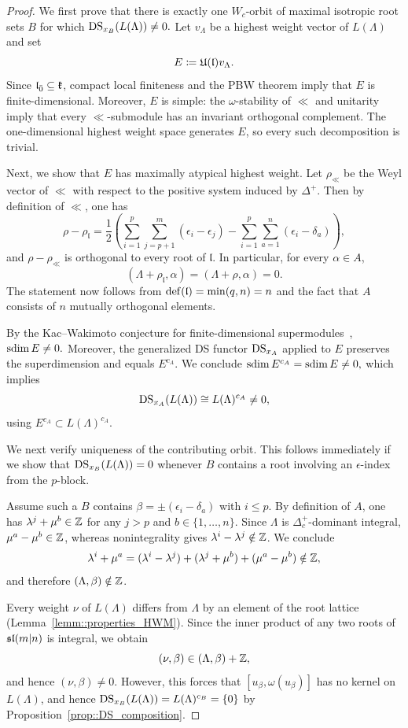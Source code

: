 \begin{proof} 
We first prove that there is exactly one $W_c$-orbit of maximal isotropic root sets $B$ for which
$
\DS_{x_B}(L(\Lambda))\neq0.
$
Let $v_\Lambda$ be a highest weight vector of $L(\Lambda)$ and set
\[
E\coloneqq\UE(\mathfrak l)v_\Lambda.
\]
Since $\mathfrak l_{\bar0}\subseteq\kk$, compact local finiteness and the PBW theorem imply that $E$ is finite-dimensional. 
Moreover, $E$ is simple: the $\omega$-stability of $\ll$ and unitarity imply that every $\ll$-submodule has an invariant orthogonal complement. The one-dimensional highest weight space generates $E$, so every such decomposition is trivial.

Next, we show that $E$ has maximally atypical highest weight. Let $\rho_{\ll}$ be the Weyl vector of $\ll$ with respect to the positive system induced by $\Delta^+$. Then by definition of $\ll$, one has
\[
\rho-\rho_{\mathfrak l}
=
\frac12\left(
\sum_{i=1}^p\sum_{j=p+1}^m(\epsilon_i-\epsilon_j)
-
\sum_{i=1}^p\sum_{a=1}^n(\epsilon_i-\delta_a)
\right),
\]
and $\rho-\rho_{\ll}$ is orthogonal to every root of $\mathfrak l$. In particular, for every $\alpha\in A$,
\[
(\Lambda+\rho_{\mathfrak l},\alpha)
=
(\Lambda+\rho,\alpha)=0.
\]
The statement now follows from $
\defect(\mathfrak l)=\min(q,n)=n
$ and the fact that $A$ consists of $n$ mutually orthogonal elements.

By the Kac--Wakimoto conjecture for finite-dimensional supermodules~\cite{serganova2011superdimension},
$
\sdim E\neq0.
$ Moreover, the generalized DS functor $\DS_{x_{A}}$ applied to $E$ preserves the superdimension and equals $E^{c_{A}}$. We conclude
$
\sdim E^{c_A}=\sdim E\neq0, 
$
which implies
\[
\DS_{x_A}(L(\Lambda))
\cong L(\Lambda)^{c_A}\neq0,
\]
using $E^{c_{A}}\subset L(\Lambda)^{c_{A}}$.

We next verify uniqueness of the contributing orbit. This follows immediately if we show that $
\DS_{x_B}(L(\Lambda))=0
$
whenever $B$ contains a root involving an $\epsilon$-index from the $p$-block.

Assume such a $B$ contains $
\beta=\pm(\epsilon_i-\delta_a)
$ with $i\leq p$. By definition of $A$, one has
$
\lambda^j+\mu^b\in\ZZ
$
for any $j>p$ and $b\in\{1,\ldots,n\}$.
Since $\Lambda$ is $\Delta_{c}^{+}$-dominant integral, $\mu^a-\mu^b\in\ZZ$, whereas nonintegrality gives $\lambda^i-\lambda^j\notin\ZZ$. We conclude
\[
\lambda^i+\mu^a
=
(\lambda^i-\lambda^j)
+(\lambda^j+\mu^b)
+(\mu^a-\mu^b)
\notin\ZZ,
\]
and therefore $(\Lambda,\beta)\notin\ZZ$.

Every weight $\nu$ of $L(\Lambda)$ differs from $\Lambda$ by an element of the root lattice (Lemma~\ref{lemm::properties_HWM}). Since the inner product of any two roots of $\sl(m\vert n)$ is integral, we obtain
\[
(\nu,\beta)\in(\Lambda,\beta)+\ZZ,
\]
and hence $(\nu,\beta)\neq0$. However, this forces that 
$
[u_\beta,\omega(u_\beta)]
$ has no kernel on $L(\Lambda)$, and hence $\DS_{x_{B}}(L(\Lambda))=L(\Lambda)^{c_B}=\{0\}$ by Proposition~\ref{prop::DS_composition}.



\end{proof}
